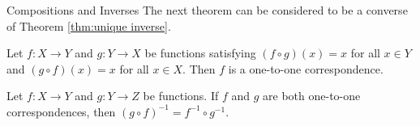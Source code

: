 \begin{section}{Compositions and Inverses}
The next theorem can be considered to be a converse of Theorem \ref{thm:unique inverse}.

\begin{theorem}
Let $f:X\to Y$ and $g:Y\to X$ be functions satisfying $(f\circ g)(x)=x$ for all $x\in Y$ and $(g\circ f)(x)=x$ for all $x\in X$.  Then $f$ is a one-to-one correspondence.
\end{theorem}

\begin{theorem}
Let $f:X\to Y$ and $g:Y\to Z$ be functions.  If $f$ and $g$ are both one-to-one correspondences, then $(g\circ f)^{-1}=f^{-1}\circ g^{-1}$.
\end{theorem}

\end{section}